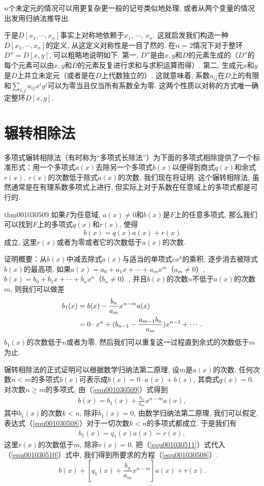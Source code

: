 $n$个未定元的情况可以用更复杂更一般的记号类似地处理, 或者从两个变量的情况出发用归纳法推导出. 

于是$D[x_1, \cdots, x_n]$事实上对称地依赖于$x_1$, $\cdots$, $x_n$. 这就启发我们构造一种$D[x_1, \cdots, x_n]$的定义, 从这定义对称性是一目了然的. 在$n=2$情况下对于整环$D''=D[x,y]$, 可以粗略地说明如下. 第一, $D''$是由$x, y$和$D$的元素生成的（$D''$的每个元素可以由$x, y$和$D$的元素反复进行求和与求积运算而得）. 第二, 生成元$x$和$y$是$D$上并立未定元（或者是在$D$上代数独立的）. 这就意味着, 系数$a_{ij}$在$D$上的有限和$\sum_{i,j}{a_{ij}x^iy^j}$可以为零当且仅当所有系数全为零. 这两个性质以对称的方式唯一确定整环$D[x, y]$. 


\section{辗转相除法}\label{section0010305}
多项式辗转相除法（有时称为“多项式长除法”）为下面的多项式相除提供了一个标准形式：用一个多项式$a(x)$去除另一个多项式$b(x)$以便得到商式$q(x)$和余式$r(x)$, $r(x)$的次数低于除式$a(x)$的次数. 我们现在将证明, 这个辗转相除法, 虽然通常是在有理系数多项式上进行, 但实际上对于系数在任意域上的多项式都是可行的. 
\begin{theorem}{}{thm001030509}
如果$F$为任意域, $a(x) \neq 0$和$b(x)$是$F$上的任意多项式, 那么我们可以找到$F$上的多项式$q(x)$和$r(x)$, 使得
\begin{equation}\label{equ001030508}
b(x)=q(x)a(x)+r(x)
\end{equation}
成立, 这里$r(x)$或者为零或者它的次数低于$a(x)$的次数. 
\end{theorem}

证明概要：从$b(x)$中减去除式$a(x)$与适当的单项式$cx^k$的乘积, 逐步消去被除式$b(x)$的最高项. 如果$a(x)=a_0+a_1x+\cdots+a_mx^m$（$a_m \neq 0$）, $b(x)=b_0+b_1x+\cdots+b_nx^n$（$b_n \neq 0$）, 并且$b(x)$的次数$n$不低于$a(x)$的次数$m$, 则我们可以做差
\begin{align}
b_1(x) &= b(x) - \frac{b_n}{a_m}x^{n-m}a(x) \notag \\
&= 0 \cdot x^n + (b_{n-1} - \frac{a_{m-1}b_n}{a_m})x^{n-1} + \cdots. \label{equ001030509}
\end{align}
$b_1(x)$的次数低于$n$或者为零. 然后我们可以重复这一过程直到余式的次数低于$m$为止. 

辗转相除法的正式证明可以根据数学归纳法第二原理, 设$m$是$a(x)$的次数. 任何次数$n < m$的多项式$b(x)$可表示成$b(x)=0 \cdot a(x)+b(x)$, 其商式$q(x)=0$. 对次数$n \ge m$的多项式, 由（\ref{equ001030509}）式得到
\begin{gather}\label{equ001030510}
b(x) = b_1(x) + \frac{b_n}{a_m}x^{n-m}a(x),
\end{gather}
其中$b_1(x)$的次数$k < n$, 除非$b_1(x)=0$, 由数学归纳法第二原理, 我们可以假定, 表达式（\ref{equ001030508}）对于一切次数$k<n$的多项式都成立. 于是我们有
\begin{gather}\label{equ001030511}
b_1(x) = q_1(x)a(x) = r(x),
\end{gather}
这里$r(x)$的次数低于$m$, 除非$r(x)=0$. 把（\ref{equ001030511}）式代入（\ref{equ001030510}）式中, 我们得到所要求的方程（\ref{equ001030508}）. 
\[
b(x) + [q_1(x) + \frac{b_n}{a_m}x^{n-m}]a(x) + r(x).
\]

